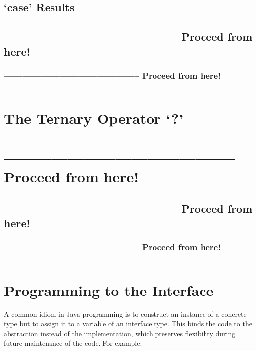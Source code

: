 \documentclass[11pt,a4paper, titlepage, parskip=half, headsepline, footsepline, cleardoublepage=current, headheight=1cm]{scrbook}
\begin{document}
\subsection{‘case’ Results}\label{sec:CaseResults}
\subsection{-------------------------------------------- Proceed from here!}
\subsubsection{-------------------------------------------- Proceed from here!}
\autocite{ORACLE_DOC_SWITCHEXPRESSIONS}
\autocite{}
\autocite{}
\autocite{}
\autocite{}
\autocite{}
\autocite{}
\autocite{}
\autocite{}
\lipsum[5]

\begin{lstlisting}
\end{lstlisting}

\section{The Ternary Operator ‘?’}\label{sec:TheTernaryOperator}
\section{-------------------------------------------- Proceed from here!}
\subsection{-------------------------------------------- Proceed from here!}
\subsubsection{-------------------------------------------- Proceed from here!}
\lipsum[5]

\begin{lstlisting}
\end{lstlisting}

\section{Programming to the Interface}\label{sec:ProgrammingToTheInterface}
A common idiom in Java programming is to construct an instance of a concrete type but to assign it to a variable of an interface type. This binds the code to the abstraction instead of the implementation, which preserves flexibility during future maintenance of the code. For example:
\end{document}
